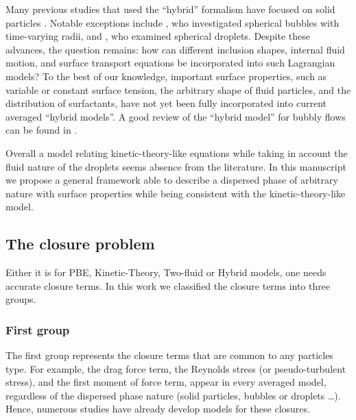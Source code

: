 Many previous studies that used the ``hybrid'' formalism have focused on solid particles \citep{buyevich1979flow,jackson1997locally}. 
Notable exceptions include \citet{zhang1994ensemble}, who investigated spherical bubbles with time-varying radii, and \citet{zhang1997momentum}, who examined spherical droplets. 
Despite these advances, the question remains: how can different inclusion shapes, internal fluid motion, and surface transport equations be incorporated into such Lagrangian models? 
To the best of our knowledge, important surface properties, such as variable or constant surface tension, the arbitrary shape of fluid particles, and the distribution of surfactants, have not yet been fully incorporated into current averaged ``hybrid models''.  
A good review of the ``hybrid model'' for bubbly flows can be found in \citet{paisant2014modelisation,morel2015mathematical}. 

Overall a model relating kinetic-theory-like equations while taking in account the fluid nature of the droplets seems absence from the literature. 
In this manuscript we propose a general framework able to describe a dispersed phase of arbitrary nature with surface properties while being consistent with the kinetic-theory-like model.

\subsection{The closure problem}

Either it is for PBE, Kinetic-Theory, Two-fluid or Hybrid  models, one needs accurate closure terms. 
In this work we classified the closure terms into three groups. 


\subsubsection{First group}
The first group represents the closure terms that are common to any particles type. 
For example, the drag force term, the Reynolds stress (or pseudo-turbulent stress), and the first moment of force term, appear in every averaged model, regardless of the dispersed phase nature (solid particles, bubbles or droplets \ldots). 
Hence, numerous studies have already develop models for these closures. 


